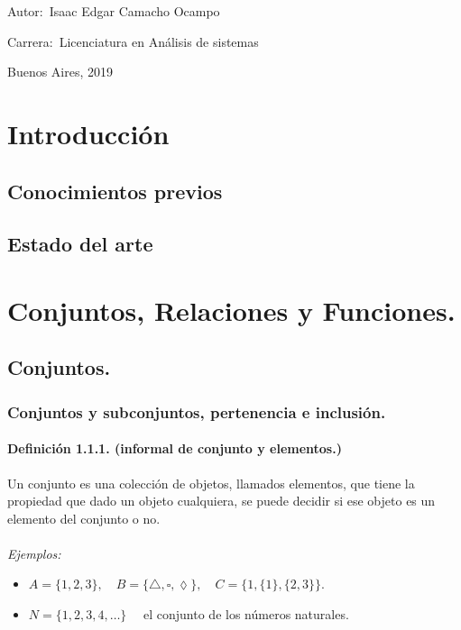 \documentclass[12pt]{book}
\begin{document}
\noindent Autor:\,	Isaac Edgar Camacho Ocampo
 
\noindent Carrera:\,	Licenciatura en An\'alisis de sistemas

\vspace{1cm}

\vspace{1cm}

\noindent Buenos Aires, 2019

\newpage


\tableofcontents

\tableofcontents
\chapter{Introducción}
\section{Conocimientos previos}
\section{Estado del arte}


\chapter{Conjuntos, Relaciones y Funciones.}
\section{Conjuntos.}
\subsection{Conjuntos y subconjuntos, pertenencia e inclusión.}
\subsubsection{Definición 1.1.1. (informal de conjunto y elementos.)}
Un conjunto es una colección de objetos, llamados elementos, que tiene la
propiedad que dado un objeto cualquiera, se puede decidir si ese objeto es
un elemento del conjunto o no.
\\
\\
\textit{Ejemplos:}
\begin{itemize}
\item $A = \{1, 2, 3\} ,\quad B = \{\triangle, \square, \lozenge \} , \quad  C = \{1, \{1\}, \{2, 3\}\} .$
\item $N = \{1, 2, 3, 4, \dots \} \quad $ el conjunto de los números naturales.
\end{itemize}
\end{document}
